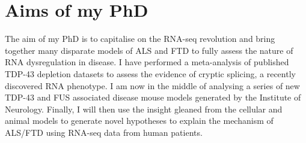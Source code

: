 %
%
%
%



%
%
%
%
%
%
%



\section{Aims of my PhD} %

The aim of my PhD is to capitalise on the RNA-seq revolution and bring together many disparate models of ALS and FTD to fully assess the nature of RNA dysregulation in disease.
I have performed a meta-analysis of published TDP-43 depletion datasets to assess the evidence of cryptic splicing, a recently discovered RNA phenotype. I am now in the middle of analysing a series of new TDP-43 and FUS associated disease mouse models generated by the Institute of Neurology. Finally, I will then use the insight gleaned from the cellular and animal models to generate novel hypotheses to explain the mechanism of ALS/FTD using RNA-seq data from human patients.

%
%
%
%	
